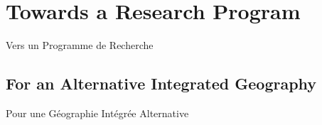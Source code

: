 















\newpage


\section*{Towards a Research Program}{Vers un Programme de Recherche}

\label{sec:researchprogram}


\subsection*{For an Alternative Integrated Geography}{Pour une Géographie Intégrée Alternative}

